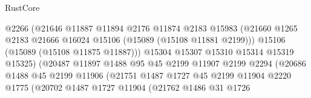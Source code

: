 \begin{lexlean}{RustCore}
\begin{coremodule}
                                        @2266
                                        (@21646
                                          @11887
                                          @11894
                                          @2176
                                          @11874
                                          @2183
                                          @15983
                                          (@21660
                                            @1265
                                            @2183
                                            @21666
                                            @16024
                                            @15106
                                            (@15089 (@15108 @11881 @2199)))
                                          @15106
                                          (@15089 (@15108 @11875 @11887)))
                                        @15304
                                        @15307
                                        @15310
                                        @15314
                                        @15319
                                        @15325)
                                      (@20487
                                        @11897
                                        @1488
                                        @95
                                        @45
                                        @2199
                                        @11907
                                        @2199
                                        @2294
                                        (@20686
                                          @1488
                                          @45
                                          @2199
                                          @11906
                                          (@21751
                                            @1487
                                            @1727
                                            @45
                                            @2199
                                            @11904
                                            @2220
                                            @1775
                                            (@20702
                                              @1487
                                              @1727
                                              @11904
                                              (@21762
                                                @1486
                                                @31
                                                @1726

\end{coremodule}
\end{lexlean}
